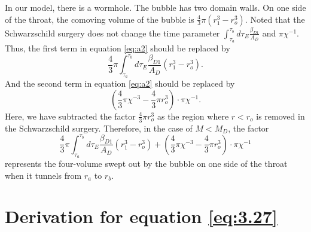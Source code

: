 \documentclass[12pt]{article}
\begin{document}
In our model, there is a wormhole. The bubble has two domain walls. On one side of the throat, the comoving volume of the bubble is $\frac{4}{3}\pi (r_{1}^{3}-r_{o}^{3})$. Noted that the Schwarzschild surgery does not change the time parameter $\int_{\tau_{a}}^{\tau_{b}}d\tau_{E}\frac{\beta_{D1}}{A_{D}}$ and $\pi\chi^{-1}$. Thus, the first term in equation \eqref{eq:a2} should be replaced by
\begin{equation}
\label{eq:a3}
\frac{4}{3}\pi\int_{\tau_{a}}^{\tau_{b}}d\tau_{E}\frac{\beta_{D1}}{A_{D}}(r_{1}^{3}-r_{o}^{3}).
\end{equation}
And the second term in equation \eqref{eq:a2} should be replaced by
\begin{equation}
\label{eq:a4}
(\frac{4}{3}\pi\chi^{-3}-\frac{4}{3}\pi r_{o}^{3})\cdot\pi\chi^{-1}.
\end{equation}
Here, we have subtracted the factor $\frac{4}{3}\pi r_{o}^{3}$ as the region where $r<r_{o}$ is removed in the Schwarzschild surgery. Therefore, in the case of $M<M_{D}$, the factor
\begin{equation}
\label{eq:a5}
\frac{4}{3}\pi\int_{\tau_{a}}^{\tau_{b}}d\tau_{E}\frac{\beta_{D1}}{A_{D}}(r_{1}^{3}-r_{o}^{3})+(\frac{4}{3}\pi\chi^{-3}-\frac{4}{3}\pi r_{o}^{3})\cdot\pi\chi^{-1}
\end{equation}
represents the four-volume swept out by the bubble on one side of the throat when it tunnels from $r_{a}$ to $r_{b}$.





\section{Derivation for equation \eqref{eq:3.27} }
\label{sec:B}
\end{document}
